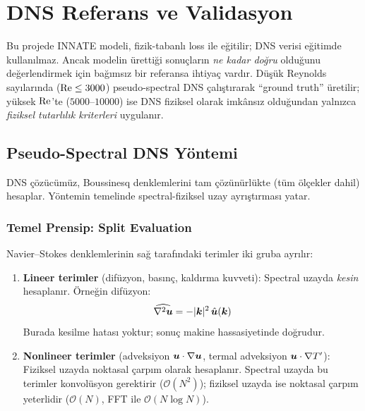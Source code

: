 \chapter{DNS Referans ve Validasyon}
\label{ch:dns_validasyon}

Bu projede INNATE modeli, fizik-tabanlı loss ile eğitilir; DNS verisi eğitimde kullanılmaz. Ancak modelin ürettiği sonuçların \textit{ne kadar doğru} olduğunu değerlendirmek için bağımsız bir referansa ihtiyaç vardır. Düşük Reynolds sayılarında ($\mathrm{Re} \leq 3000$) pseudo-spectral DNS çalıştırarak ``ground truth'' üretilir; yüksek $\mathrm{Re}$'te ($5000$--$10000$) ise DNS fiziksel olarak imkânsız olduğundan yalnızca \textit{fiziksel tutarlılık kriterleri} uygulanır.


\section{Pseudo-Spectral DNS Yöntemi}
\label{sec:dns_yontem}

DNS çözücümüz, Boussinesq denklemlerini tam çözünürlükte (tüm ölçekler dahil) hesaplar. Yöntemin temelinde spectral-fiziksel uzay ayrıştırması yatar.

\subsection{Temel Prensip: Split Evaluation}

Navier--Stokes denklemlerinin sağ tarafındaki terimler iki gruba ayrılır:

\begin{enumerate}
    \item \textbf{Lineer terimler} (difüzyon, basınç, kaldırma kuvveti):
    Spectral uzayda \textit{kesin} hesaplanır. Örneğin difüzyon:
    \begin{equation}
        \widehat{\nabla^2 \bm{u}} = -|\bm{k}|^2 \, \hat{\bm{u}}(\bm{k})
    \end{equation}
    Burada kesilme hatası yoktur; sonuç makine hassasiyetinde doğrudur.

    \item \textbf{Nonlineer terimler} (adveksiyon $\bm{u} \cdot \nabla \bm{u}$, termal adveksiyon $\bm{u} \cdot \nabla T'$):
    Fiziksel uzayda noktasal çarpım olarak hesaplanır. Spectral uzayda bu terimler konvolüsyon gerektirir ($\mathcal{O}(N^2)$); fiziksel uzayda ise noktasal çarpım yeterlidir ($\mathcal{O}(N)$, FFT ile $\mathcal{O}(N\log N)$).
\end{enumerate}

